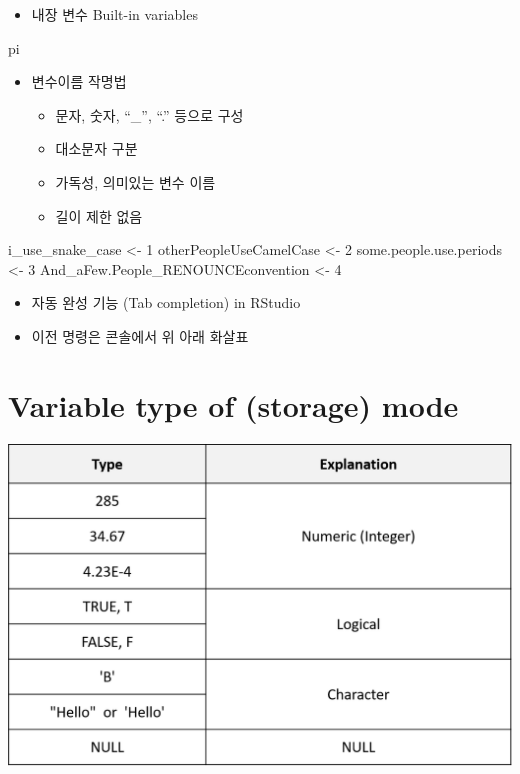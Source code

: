 \documentclass[
]{book}
\newenvironment{Shaded}{\begin{snugshade}}{\end{snugshade}}
\newcommand{\DecValTok}[1]{\textcolor[rgb]{0.00,0.00,0.81}{#1}}
\newcommand{\NormalTok}[1]{#1}
\newcommand{\StringTok}[1]{\textcolor[rgb]{0.31,0.60,0.02}{#1}}
\providecommand{\tightlist}{%
  \setlength{\itemsep}{0pt}\setlength{\parskip}{0pt}}
\begin{document}
\begin{itemize}
\tightlist
\item
  내장 변수 Built-in variables
\end{itemize}

\begin{Shaded}
\begin{Highlighting}[]
\NormalTok{pi}
\end{Highlighting}
\end{Shaded}

\begin{itemize}
\tightlist
\item
  변수이름 작명법

  \begin{itemize}
  \tightlist
  \item
    문자, 숫자, ``\_'', ``.'' 등으로 구성
  \item
    대소문자 구분
  \item
    가독성, 의미있는 변수 이름
  \item
    길이 제한 없음
  \end{itemize}
\end{itemize}

\begin{Shaded}
\begin{Highlighting}[]
\NormalTok{i\_use\_snake\_case <{-}}\StringTok{ }\DecValTok{1}
\NormalTok{otherPeopleUseCamelCase <{-}}\StringTok{ }\DecValTok{2}
\NormalTok{some.people.use.periods <{-}}\StringTok{ }\DecValTok{3}
\NormalTok{And\_aFew.People\_RENOUNCEconvention <{-}}\StringTok{ }\DecValTok{4}
\end{Highlighting}
\end{Shaded}

\begin{itemize}
\tightlist
\item
  자동 완성 기능 (Tab completion) in RStudio
\item
  이전 명령은 콘솔에서 위 아래 화살표
\end{itemize}

\hypertarget{variable-type-of-storage-mode}{%
\section{Variable type of (storage) mode}\label{variable-type-of-storage-mode}}

\includegraphics{images/01/01-13.PNG}
\end{document}
